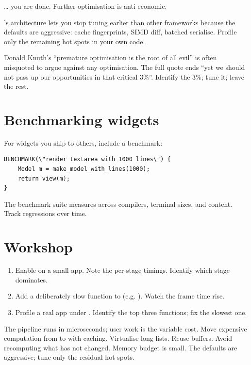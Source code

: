 \ldots{} you are done. Further optimisation is anti-economic.

\maya{}'s architecture lets you stop tuning earlier than other
frameworks because the defaults are aggressive: cache
fingerprints, SIMD diff, batched serialise. Profile only the
remaining hot spots in your own code.

\begin{aside}
Donald Knuth's ``premature optimisation is the root of all evil''
is often misquoted to argue against any optimisation. The full
quote ends ``yet we should not pass up our opportunities in that
critical 3\%''. Identify the 3\%; tune it; leave the rest.
\end{aside}

\section{Benchmarking widgets}

For widgets you ship to others, include a benchmark:

\begin{lstlisting}
BENCHMARK(\"render textarea with 1000 lines\") {
    Model m = make_model_with_lines(1000);
    return view(m);
}
\end{lstlisting}

The benchmark suite measures across compilers, terminal sizes,
and content. Track regressions over time.

\section*{Workshop}

\begin{enumerate}[leftmargin=*]
  \item Enable  on a small app.
    Note the per-stage timings. Identify which stage dominates.
  \item Add a deliberately slow function to  (e.g.
    ). Watch the
    frame time rise.
  \item Profile a real app under . Identify the top
    three functions; fix the slowest one.
\end{enumerate}

\begin{recap}
The pipeline runs in microseconds; user work is the variable
cost. Move expensive computation from  to
 with caching. Virtualise long lists. Reuse
buffers. Avoid recomputing what has not changed. Memory budget
is small. The defaults are aggressive; tune only the residual
hot spots.
\end{recap}
